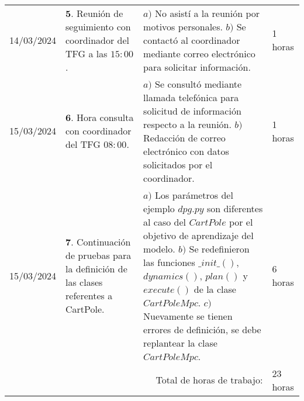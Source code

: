 \documentclass[12pt]{article}
\begin{document}
\hfill\\
\begin{minipage}[h]{\textwidth}
	\centering
	\begin{tabularx}{\textwidth}{|p{2cm}|X|X|p{2cm}|} 
		\hline		
		
	 	14/03/2024 & 
	 	$\mathbf{5}.$ Reunión de seguimiento con coordinador del TFG a las $15:00$. &
	 	$a)$ No asistí a la reunión por motivos personales. \newline 
	 	$b)$ Se contactó al coordinador mediante correo electrónico para solicitar información. \newline & 
	 	1 horas \\
		15/03/2024 & 
	 	$\mathbf{6}.$ Hora consulta con coordinador del TFG $08:00$. &
	 	$a)$ Se consultó mediante llamada telefónica para solicitud de información respecto a la reunión. \newline
	 	$b)$ Redacción de correo electrónico con datos solicitados por el coordinador. \newline & 
	 	1 horas \\
	 	15/03/2024 & 
	 	$\mathbf{7}.$ Continuación de pruebas para la definición de las clases referentes a CartPole. &
	 	$a)$ Los parámetros del ejemplo $dpg.py$ son diferentes al caso del $CartPole$ por el objetivo de aprendizaje del modelo. \newline
	 	$b)$ Se redefinieron las funciones $\_init\_()$, $dynamics()$, $plan()$ y $execute()$ de la clase $CartPoleMpc$. \newline
	 	$c)$ Nuevamente se tienen errores de definición, se debe replantear la clase $CartPoleMpc$. \newline & 
	 	6 horas \\
	 	
	 	\hline
		\multicolumn{3}{|r|}{Total de horas de trabajo:} & 23 horas \\ 
	 	\hline                 
	\end{tabularx}
\end{minipage}



\end{document}
